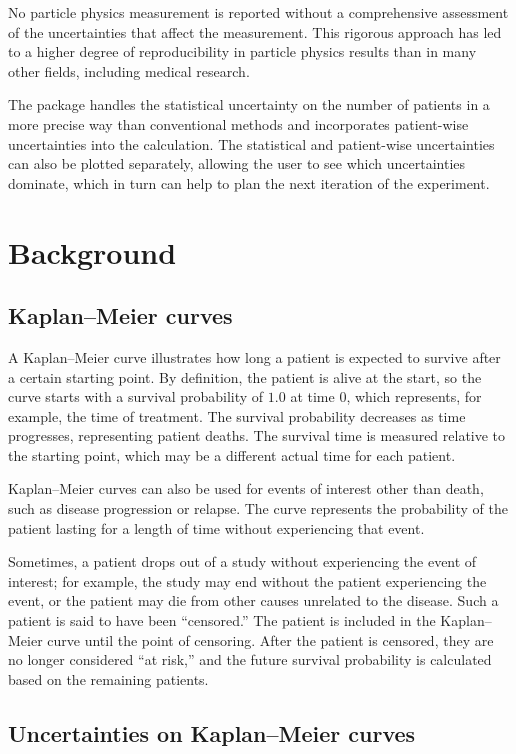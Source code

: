 \documentclass[article]{jss}
\newcommand{\KM}{Kaplan--Meier} %
\begin{document}
No particle physics measurement is reported without a comprehensive assessment of the uncertainties that affect the measurement. This rigorous approach has led to a higher degree of reproducibility in particle physics results than in many other fields, including medical research.

The  package handles the statistical uncertainty on the number of patients in a more precise way than conventional methods and incorporates patient-wise uncertainties into the calculation. The statistical and patient-wise uncertainties can also be plotted separately, allowing the user to see which uncertainties dominate, which in turn can help to plan the next iteration of the experiment.

\section{Background}\label{sec:background}

\subsection{\KM{} curves}

A \KM{} curve illustrates how long a patient is expected to survive after a certain starting point. By definition, the patient is alive at the start, so the curve starts with a survival probability of \(1.0\) at time \(0\), which represents, for example, the time of treatment. The survival probability decreases as time progresses, representing patient deaths. The survival time is measured relative to the starting point, which may be a different actual time for each patient.

\KM{} curves can also be used for events of interest other than death, such as disease progression or relapse. The curve represents the probability of the patient lasting for a length of time without experiencing that event.

Sometimes, a patient drops out of a study without experiencing the event of interest; for example, the study may end without the patient experiencing the event, or the patient may die from other causes unrelated to the disease. Such a patient is said to have been ``censored.'' The patient is included in the \KM{} curve until the point of censoring. After the patient is censored, they are no longer considered ``at risk,'' and the future survival probability is calculated based on the remaining patients.

\subsection{Uncertainties on \KM{} curves}
\end{document}
